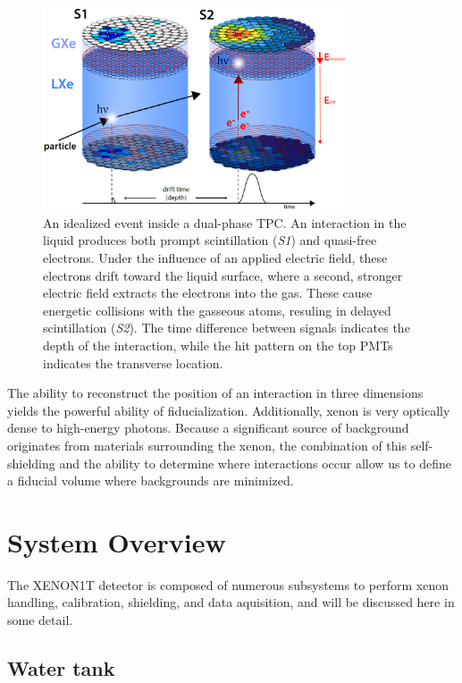 \begin{figure}[htb]
\centering
	\includegraphics[width=0.8\textwidth]{figures/xe1t/tpc_xe1t_workingprinciple_v2.png}
	\caption{An idealized event inside a dual-phase TPC. An interaction in the liquid produces both prompt scintillation (\textit{S1}) and quasi-free electrons. Under the influence of an applied electric field, these electrons drift toward the liquid surface, where a second, stronger electric field extracts the electrons into the gas. These cause energetic collisions with the gasseous atoms, resuling in delayed scintillation (\textit{S2}). The time difference between signals indicates the depth of the interaction, while the hit pattern on the top PMTs indicates the transverse location.}\label{fig:idealized_event}
\end{figure}

The ability to reconstruct the position of an interaction in three dimensions yields the powerful ability of fiducialization. Additionally, xenon is very optically dense to high-energy photons. Because a significant source of background originates from materials surrounding the xenon, the combination of this self-shielding and the ability to determine where interactions occur allow us to define a fiducial volume where backgrounds are minimized.

\section{System Overview}

The XENON1T detector is composed of numerous subsystems to perform xenon handling, calibration, shielding, and data aquisition, and will be discussed here in some detail.

\subsection{Water tank}

